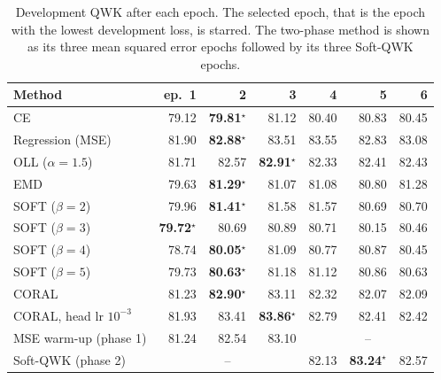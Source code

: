 \begin{table}[H]
\centering
\footnotesize
\caption{Development QWK after each epoch. The selected epoch, that is the epoch with the lowest development loss, is starred. The two-phase method is shown as its three mean squared error epochs followed by its three Soft-QWK epochs.}
\label{tab:res-epochs}
\begin{tabular}{lrrrrrr}
\toprule
\textbf{Method} & \textbf{ep.\ 1} & \textbf{2} & \textbf{3} & \textbf{4} & \textbf{5} & \textbf{6} \\
\midrule
CE & 79.12 & \textbf{79.81}$^{\star}$ & 81.12 & 80.40 & 80.83 & 80.45 \\
Regression (MSE) & 81.90 & \textbf{82.88}$^{\star}$ & 83.51 & 83.55 & 82.83 & 83.08 \\
OLL ($\alpha=1.5$) & 81.71 & 82.57 & \textbf{82.91}$^{\star}$ & 82.33 & 82.41 & 82.43 \\
EMD & 79.63 & \textbf{81.29}$^{\star}$ & 81.07 & 81.08 & 80.80 & 81.28 \\
SOFT ($\beta=2$) & 79.96 & \textbf{81.41}$^{\star}$ & 81.58 & 81.57 & 80.69 & 80.70 \\
SOFT ($\beta=3$) & \textbf{79.72}$^{\star}$ & 80.69 & 80.89 & 80.71 & 80.15 & 80.46 \\
SOFT ($\beta=4$) & 78.74 & \textbf{80.05}$^{\star}$ & 81.09 & 80.77 & 80.87 & 80.45 \\
SOFT ($\beta=5$) & 79.73 & \textbf{80.63}$^{\star}$ & 81.18 & 81.12 & 80.86 & 80.63 \\
CORAL & 81.23 & \textbf{82.90}$^{\star}$ & 83.11 & 82.32 & 82.07 & 82.09 \\
CORAL, head lr $10^{-3}$ & 81.93 & 83.41 & \textbf{83.86}$^{\star}$ & 82.79 & 82.41 & 82.42 \\
\midrule
MSE warm-up (phase 1) & 81.24 & 82.54 & 83.10 & \multicolumn{3}{c}{--} \\
Soft-QWK (phase 2) & \multicolumn{3}{c}{--} & 82.13 & \textbf{83.24}$^{\star}$ & 82.57 \\
\bottomrule
\end{tabular}
\end{table}
